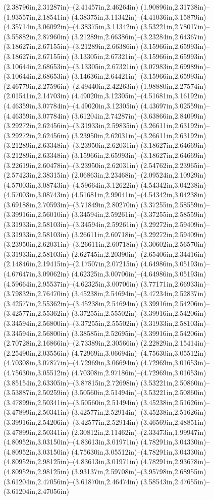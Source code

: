 (2.38796in,2.31287in)--(2.41457in,2.46264in) (1.90896in,2.31738in)--(1.93557in,2.18541in) (4.38375in,3.11342in)--(4.41036in,3.15879in) (4.35714in,3.06092in)--(4.38375in,3.11342in) (3.53221in,2.78017in)--(3.55882in,2.87960in) (3.21289in,2.66386in)--(3.23284in,2.64367in) (3.18627in,2.67155in)--(3.21289in,2.66386in) (3.15966in,2.65993in)--(3.18627in,2.67155in) (3.13305in,2.67321in)--(3.15966in,2.65993in) (3.10644in,2.68653in)--(3.13305in,2.67321in) (3.07983in,2.69989in)--(3.10644in,2.68653in) (3.14636in,2.64421in)--(3.15966in,2.65993in) (2.46779in,2.27596in)--(2.49440in,2.42263in) (1.98880in,2.27574in)--(2.01541in,2.14703in) (4.49020in,3.12305in)--(4.51681in,3.16192in) (4.46359in,3.07784in)--(4.49020in,3.12305in) (4.43697in,3.02559in)--(4.46359in,3.07784in) (3.61204in,2.74287in)--(3.63866in,2.84099in) (3.29272in,2.62456in)--(3.31933in,2.59835in) (3.26611in,2.63192in)--(3.29272in,2.62456in) (3.23950in,2.62031in)--(3.26611in,2.63192in) (3.21289in,2.63348in)--(3.23950in,2.62031in) (3.18627in,2.64669in)--(3.21289in,2.63348in) (3.15966in,2.65993in)--(3.18627in,2.64669in) (3.22619in,2.60478in)--(3.23950in,2.62031in) (2.54762in,2.23965in)--(2.57423in,2.38315in) (2.06863in,2.23468in)--(2.09524in,2.10929in) (4.57003in,3.08743in)--(4.59664in,3.12622in) (4.54342in,3.04238in)--(4.57003in,3.08743in) (4.51681in,2.99041in)--(4.54342in,3.04238in) (3.69188in,2.70593in)--(3.71849in,2.80270in) (3.37255in,2.58559in)--(3.39916in,2.56010in) (3.34594in,2.59261in)--(3.37255in,2.58559in) (3.31933in,2.58103in)--(3.34594in,2.59261in) (3.29272in,2.59409in)--(3.31933in,2.58103in) (3.26611in,2.60718in)--(3.29272in,2.59409in) (3.23950in,2.62031in)--(3.26611in,2.60718in) (3.30602in,2.56570in)--(3.31933in,2.58103in) (2.62745in,2.20390in)--(2.65406in,2.34416in) (2.14846in,2.19415in)--(2.17507in,2.07215in) (4.64986in,3.05193in)--(4.67647in,3.09062in) (4.62325in,3.00706in)--(4.64986in,3.05193in) (4.59664in,2.95537in)--(4.62325in,3.00706in) (3.77171in,2.66933in)--(3.79832in,2.76470in) (3.45238in,2.54694in)--(3.47234in,2.52837in) (3.42577in,2.55362in)--(3.45238in,2.54694in) (3.39916in,2.54206in)--(3.42577in,2.55362in) (3.37255in,2.55502in)--(3.39916in,2.54206in) (3.34594in,2.56800in)--(3.37255in,2.55502in) (3.31933in,2.58103in)--(3.34594in,2.56800in) (3.38585in,2.52695in)--(3.39916in,2.54206in) (2.70728in,2.16866in)--(2.73389in,2.30566in) (2.22829in,2.15414in)--(2.25490in,2.03556in) (4.72969in,3.06694in)--(4.75630in,3.05512in) (4.70308in,3.07877in)--(4.72969in,3.06694in) (4.72969in,3.01653in)--(4.75630in,3.05512in) (4.70308in,2.97186in)--(4.72969in,3.01653in) (3.85154in,2.63305in)--(3.87815in,2.72698in) (3.53221in,2.50860in)--(3.53887in,2.50259in) (3.50560in,2.51494in)--(3.53221in,2.50860in) (3.47899in,2.50341in)--(3.50560in,2.51494in) (3.45238in,2.51626in)--(3.47899in,2.50341in) (3.42577in,2.52914in)--(3.45238in,2.51626in) (3.39916in,2.54206in)--(3.42577in,2.52914in) (3.46569in,2.48851in)--(3.47899in,2.50341in) (2.30812in,2.11462in)--(2.33473in,1.99947in) (4.80952in,3.03150in)--(4.83613in,3.01971in) (4.78291in,3.04330in)--(4.80952in,3.03150in) (4.75630in,3.05512in)--(4.78291in,3.04330in) (4.80952in,2.98125in)--(4.83613in,3.01971in) (4.78291in,2.93678in)--(4.80952in,2.98125in) (3.93137in,2.59708in)--(3.95798in,2.68955in) (3.61204in,2.47056in)--(3.61870in,2.46474in) (3.58543in,2.47655in)--(3.61204in,2.47056in) 